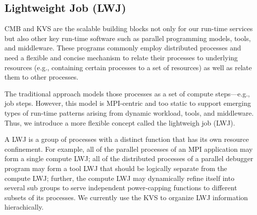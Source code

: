 \subsection{Lightweight Job (LWJ)}
CMB and KVS are the scalable building blocks not only for our run-time services 
but also other key run-time software such as parallel programming models, 
tools, and middleware. These programs commonly employ distributed processes and need a 
flexible and concise mechanism to relate their processes to underlying resources 
(e.g., containing certain processes to a set of resources) as well as relate 
them to other processes. 

The traditional approach models those processes as
a set of compute steps---e.g., job steps. However, this model 
is MPI-centric and too static to support emerging types
of run-time patterns arising from dynamic workload, tools, and middleware.
Thus, we introduce a more flexible concept called the lightweigh job (LWJ).

A LWJ is a group
of processes with a distinct function that has its own resource confinement. 
For example, all of the parallel
processes of an MPI application may form a single compute LWJ; all of the distributed processes
of a parallel debugger program may form a tool LWJ that should be logically separate from the
compute LWJ; further, the compute LWJ may dynamically refine itself into several 
sub groups to serve independent power-capping functions to different subsets of its processes.
We currently use the KVS to organize LWJ information hierachically.
